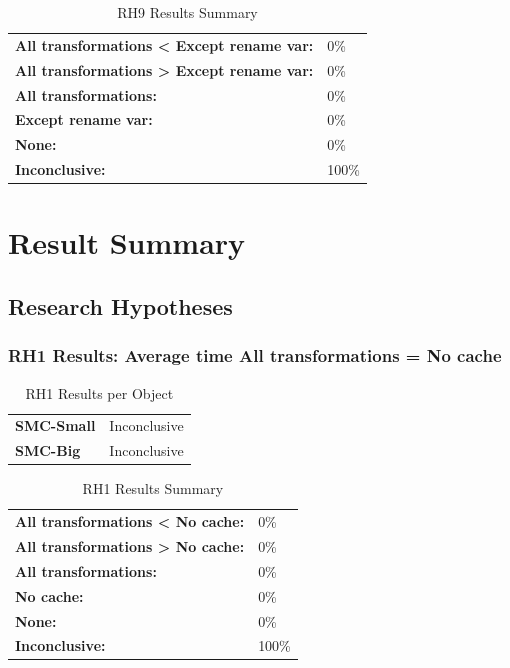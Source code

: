 \documentclass{article}\usepackage[]{graphicx}\usepackage[]{color}
\begin{document}
	\begin{table}[H]
	\centering
	\caption{RH9 Results Summary}
	\begin{tabular}{ll}
	\textbf{All transformations \textless{} Except rename var:}& 0\% \\
	\textbf{All transformations \textgreater{} Except rename var:}& 0\%\\
	\textbf{All transformations:} & 0\%\\
	\textbf{Except rename var:} & 0\%\\
	\textbf{None:}& 0\%\\
	\textbf{Inconclusive:}& 100\%
			
	
	\end{tabular}
	\end{table}
	
	
	



\section{Result Summary}
\subsection{Research Hypotheses}


	
	\subsubsection{RH1 Results: Average time All transformations = No cache}
	
	
	\begin{table}[H]
	\centering
	\caption{RH1 Results per Object}
	\begin{tabular}{ll}
	\textbf{SMC-Small} & Inconclusive \\
	\textbf{SMC-Big} & Inconclusive \\
	\end{tabular}
	\end{table}

	\begin{table}[H]
	\centering
	\caption{RH1 Results Summary}
	\begin{tabular}{ll}
	\textbf{All transformations \textless{} No cache:}& 0\% \\
	\textbf{All transformations \textgreater{} No cache:}& 0\%\\
	\textbf{All transformations:} & 0\%\\
	\textbf{No cache:} & 0\%\\
	\textbf{None:}& 0\%\\
	\textbf{Inconclusive:}& 100\%
			
	
	\end{tabular}
	\end{table}
	
\end{document}
